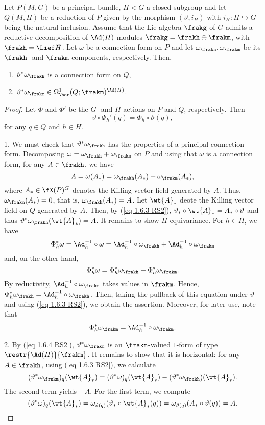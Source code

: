 \begin{prop}[{{\cite[Prop.~1.6.8]{RS2}}}]\label{prop 1.6.8 RS2}
    Let $P(M,G)$ be a principal bundle, $H<G$ a closed subgroup and let $Q(M,H)$ be a reduction of $P$ given by the morphism $(\vartheta,i_H)$ with $i_H:H\hookrightarrow G$ being the natural inclusion. Assume that the Lie algebra $\frakg$ of $G$ admits a reductive decomposition of $\Ad(H)$-modules
    $\frakg=\frakh\oplus\frakm$,
    with $\frakh=\Lief H$. Let $\omega$ be a connection form on $P$ and let $\omega_\frakh,\omega_\frakm$ be its $\frakh$- and $\frakm$-components, respectively. Then,
    \begin{enumerate}
        \item $\vartheta^\ast\omega_\frakh$ is a connection form on $Q$,
        \item $\vartheta^\ast\omega_\frakm\in \Omega^1_{\hor}(Q;\frakm)^{\Ad(H)}$.
    \end{enumerate}
\end{prop}
\begin{proof}
    Let $\Phi$ and $\Phi'$ be the $G$- and $H$-actions on $P$ and $Q$, respectively. Then
    \[\vartheta\circ\Phi_h'(q)=\Phi_h\circ \vartheta(q),\label{eq 1.6.3 RS2}\]
    for any $q\in Q$ and $h\in H$.
    
    1. We must check that $\vartheta^\ast\omega_\frakh$ has the properties of a principal connection form. Decomposing $\omega=\omega_\frakh+\omega_\frakm$ on $P$ and using that $\omega$ is a connection form, for any $A\in\frakh$, we have
    \[A=\omega(A_\ast)=\omega_\frakh(A_\ast)+\omega_\frakm(A_\ast),\]
    where $A_\ast\in \fX(P)^G$ denotes the Killing vector field generated by $A$. Thus, $\omega_\frakm(A_\ast)=0$, that is, $\omega_\frakh(A_\ast)=A$. Let $\wt{A}_\ast$ deote the Killing vector field on $Q$ generated by $A$. Then, by (\ref{eq 1.6.3 RS2}), $\vartheta_\ast\circ \wt{A}_\ast=A_\ast\circ\vartheta$ and thus $\vartheta^\ast\omega_\frakh(\wt{A}_\ast)=A$. It remains to show $H$-equivariance. For $h\in H$, we have
    \[\Phi_h^\ast\omega=\Ad_h^{-1}\circ \omega=\Ad_h^{-1}\circ \omega_\frakh+\Ad_h^{-1}\circ\omega_\frakm\]
    and, on the other hand,
    \[\Phi^\ast_h\omega=\Phi^\ast_h\omega_\frakh+\Phi^\ast_h\omega_\frakm.\]
    By reductivity, $\Ad_h^{-1}\circ\omega_\frakm$ takes values in $\frakm$. Hence, $\Phi^\ast_h\omega_\frakh=\Ad_h^{-1}\circ\omega_\frakh$. Then, taking the pullback of this equation under $\vartheta$ and using (\ref{eq 1.6.3 RS2}), we obtain the assertion. Moreover, for later use, note that
    \[\Phi_h^\ast\omega_\frakm=\Ad_h^{-1}\circ\omega_\frakm.\label{eq 1.6.4 RS2}\]

    2. By (\ref{eq 1.6.4 RS2}), $\vartheta^\ast\omega_\frakm$ is an $\frakm$-valued $1$-form of type $\restr{\Ad(H)}{\frakm}$. It remains to show that it is horizontal: for any $A\in\frakh$, using (\ref{eq 1.6.3 RS2}), we calculate
    \[(\vartheta^\ast\omega_\frakm)_q(\wt{A}_\ast)=(\vartheta^\ast\omega)_q(\wt{A}_\ast)-(\vartheta^\ast\omega_\frakh)(\wt{A}_\ast).\]
    The second term yields $-A$. For the first term, we compute
    \[(\vartheta^\ast\omega)_q(\wt{A}_\ast)=\omega_{\vartheta(q)}(\vartheta_\ast\circ \wt{A}_\ast(q))=\omega_{\vartheta(q)}(A_\ast\circ \vartheta(q))=A.\]
\end{proof}


